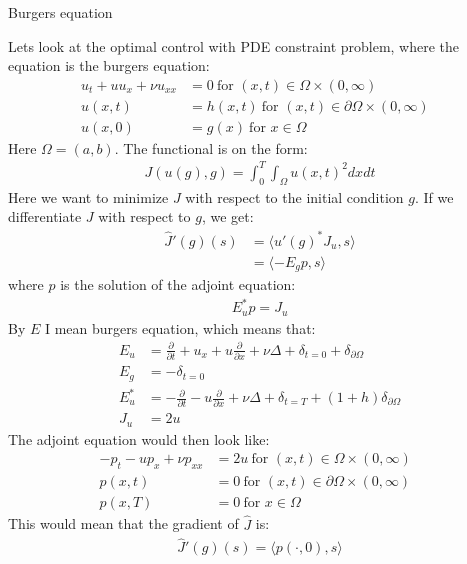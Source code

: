 \documentclass[11pt,a4paper]{report}
\begin{document}
\begin{center}

\LARGE Burgers equation


\end{center}
Lets look at the optimal control with PDE constraint problem, where the equation is the burgers equation:
\begin{align*}
u_t + uu_x + \nu u_{xx} &= 0 \ \text{for $(x,t)\in \Omega\times(0,\infty)$}\\
u(x,t) &= h(x,t) \ \text{for $(x,t) \in\partial\Omega\times(0,\infty)$ } \\
u(x,0) &= g(x) \ \text{for $x \in\Omega$ }
\end{align*} 
Here $\Omega = (a,b)$. The functional is on the form:
\begin{align*}
J(u(g),g) = \int_0^T\int_{\Omega} u(x,t)^2 dxdt
\end{align*}
Here we want to minimize $J$ with respect to the initial condition $g$. If we differentiate $J$ with respect to $g$, we get:
\begin{align*}
\hat{J}'(g)(s) &= \langle u'(g)^*J_u,s \rangle \\
&= \langle -E_gp,s \rangle
\end{align*}
where $p$ is the solution of the adjoint equation:
\begin{align*}
E_u^*p = J_u
\end{align*}
By $E$ I mean burgers equation, which means that:
\begin{align*}
E_u &= \frac{\partial}{\partial t} + u_x + u\frac{\partial}{\partial x} + \nu\Delta + \delta_{t=0} + \delta_{\partial \Omega} \\
E_g &= -\delta_{t=0} \\
E_u^* &= -\frac{\partial}{\partial t}  -u\frac{\partial}{\partial x}+ \nu\Delta + \delta_{t=T} + (1+h)\delta_{\partial \Omega} \\
J_u &= 2u
\end{align*}
The adjoint equation would then look like:
\begin{align*}
-p_t -up_x + \nu p_{xx} &= 2u \ \text{for $(x,t)\in \Omega\times(0,\infty)$}\\
p(x,t) &= 0 \ \text{for $(x,t) \in\partial\Omega\times(0,\infty)$ } \\
p(x,T) &= 0 \ \text{for $x \in\Omega$ }
\end{align*}
This would mean that the gradient of $\hat{J}$ is:
\begin{align*}
\hat{J}'(g)(s) = \langle p(\cdot,0), s\rangle
\end{align*}
\end{document}
